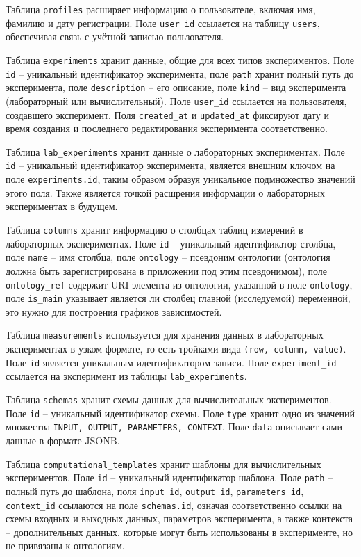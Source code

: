 Таблица \texttt{profiles} расширяет информацию о пользователе, включая имя, фамилию и дату регистрации. Поле \texttt{user\_id} ссылается на таблицу \texttt{users}, обеспечивая связь с учётной записью пользователя.

Таблица \texttt{experiments} хранит данные, общие для всех типов экспериментов. Поле \texttt{id} -- уникальный идентификатор эксперимента, поле \texttt{path} хранит полный путь до эксперимента, поле \texttt{description} -- его описание, поле \texttt{kind} -- вид эксперимента (лабораторный или вычислительный). Поле \texttt{user\_id} ссылается на пользователя, создавшего эксперимент. Поля \texttt{created\_at} и \texttt{updated\_at} фиксируют дату и время создания и последнего редактирования эксперимента соответственно.

Таблица \texttt{lab\_experiments} хранит данные о лабораторных экспериментах. Поле \texttt{id} -- уникальный идентификатор эксперимента, является внешним ключом на поле \texttt{experiments.id}, таким образом образуя уникальное подмножество значений этого поля. Также является точкой расшрения информации о лабораторных экспериментах в будущем.

Таблица \texttt{columns} хранит информацию о столбцах таблиц измерений в лабораторных экспериментах. Поле \texttt{id} -- уникальный идентификатор столбца, поле \texttt{name} -- имя столбца, поле \texttt{ontology} -- псевдоним онтологии (онтология должна быть зарегистрирована в приложении под этим псевдонимом), поле \texttt{ontology\_ref} содержит URI элемента из онтологии, указанной в поле \texttt{ontology}, поле \texttt{is\_main} указывает является ли столбец главной (исследуемой) переменной, это нужно для построения графиков зависимостей.

Таблица \texttt{measurements} используется для хранения данных в лабораторных экспериментах в узком формате, то есть тройками вида \texttt{(row, column, value)}. Поле \texttt{id} является уникальным идентификатором записи. Поле \texttt{experiment\_id} ссылается на эксперимент из таблицы \texttt{lab\_experiments}.

Таблица \texttt{schemas} хранит схемы данных для вычислительных экспериментов. Поле \texttt{id} -- уникальный идентификатор схемы. Поле \texttt{type} хранит одно из значений множества \texttt{{INPUT, OUTPUT, PARAMETERS, CONTEXT}}. Поле \texttt{data} описывает сами данные в формате JSONB.

Таблица \texttt{computational\_templates} хранит шаблоны для вычислительных экспериментов. Поле \texttt{id} -- уникальный идентификатор шаблона. Поле \texttt{path} -- полный путь до шаблона, поля \texttt{input\_id}, \texttt{output\_id}, \texttt{parameters\_id}, \texttt{context\_id} ссылаются на поле \texttt{schemas.id}, означая соответственно ссылки на схемы входных и выходных данных, параметров эксперимента, а также контекста -- дополнительных данных, которые могут быть использованы в эксперименте, но не привязаны к онтологиям.

